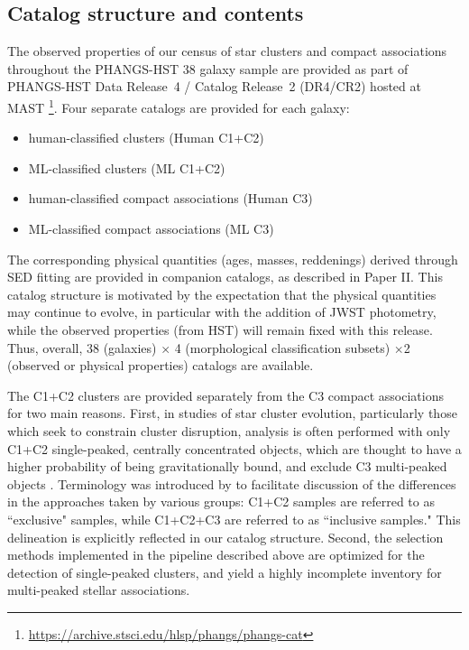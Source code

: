 \documentclass[]{aastex631}
\begin{document}
\subsection{Catalog structure and contents}\label{ssect:cat_content}
The observed properties of our census of star clusters and compact associations throughout the PHANGS-HST 38 galaxy sample are provided as part of PHANGS-HST Data Release~4 / Catalog Release~2 (DR4/CR2) hosted at MAST
\footnote{\url{https://archive.stsci.edu/hlsp/phangs/phangs-cat}}.  Four separate catalogs are provided for each galaxy: 
\begin{itemize}
    \item human-classified clusters (Human C1+C2)
    \item ML-classified clusters (ML C1+C2)
    \item human-classified compact associations (Human C3)
    \item ML-classified compact associations (ML C3)
\end{itemize}
The corresponding physical quantities (ages, masses, reddenings) derived through SED fitting are provided in companion catalogs, as described in Paper II.  This catalog structure is motivated by the expectation that the physical quantities may continue to evolve, in particular with the addition of JWST photometry, while the observed properties (from HST) will remain fixed with this release. Thus, overall, 38 (galaxies) $\times$ 4 (morphological classification subsets) $ \times$2 (observed or physical properties) catalogs are available.


The C1+C2 clusters are provided separately from the C3 compact associations for two main reasons.  First, in studies of star cluster evolution, particularly those which seek to constrain cluster disruption, analysis is often performed with only C1+C2 single-peaked, centrally concentrated objects, which are thought to have a higher probability of being gravitationally bound, and exclude C3 multi-peaked objects \citep{bastian_stellar_2012, chandar_star-cluster_2014}.  Terminology was introduced by \citet{krumholz_star_2019} to facilitate discussion of the differences in the approaches taken by various groups: C1+C2 samples are referred to as ``exclusive" samples, while C1+C2+C3 are referred to as ``inclusive samples."  This delineation is explicitly reflected in our catalog structure. Second, the selection methods implemented in the pipeline described above are optimized for the detection of single-peaked clusters, and yield a highly incomplete inventory for multi-peaked stellar associations.  
\end{document}

